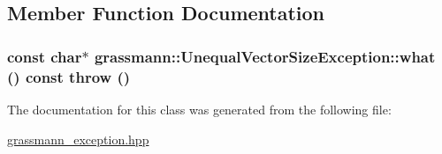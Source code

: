 \subsection{Member Function Documentation}
\hypertarget{classgrassmann_1_1UnequalVectorSizeException_59c3b028a8afe8b6b62d0cb7dfa10dbe}{
\subsubsection[what]{\setlength{\rightskip}{0pt plus 5cm}const char$\ast$ grassmann::UnequalVectorSizeException::what () const  throw ()}}
\label{classgrassmann_1_1UnequalVectorSizeException_59c3b028a8afe8b6b62d0cb7dfa10dbe}




The documentation for this class was generated from the following file:\begin{CompactItemize}
\item 
\hyperlink{grassmann__exception_8hpp}{grassmann\_\-exception.hpp}\end{CompactItemize}

